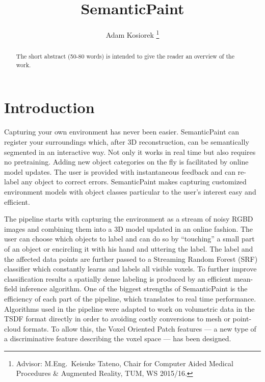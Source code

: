 \documentclass{llncs}
\begin{document}
	\title{SemanticPaint}
	\author{Adam Kosiorek
	\thanks{Advisor: M.Eng.~Keisuke Tateno, Chair for Computer Aided Medical Procedures \& Augmented Reality, TUM, WS 2015/16.}}
	\institute{}
	\maketitle

\begin{abstract}
	The short abstract (50-80 words) is intended to give the reader an overview of the work.
\end{abstract}

\section{Introduction}
  
  Capturing your own environment has never been easier. SemanticPaint can register your surroundings which, after 3D reconstruction, can be semantically segmented in an interactive way. Not only it works in real time but also requires no pretraining. Adding new object categories on the fly is facilitated by online model updates. The user is provided with instantaneous feedback and can re-label any object to correct errors. SemanticPaint makes capturing customized environment models with object classes particular to the user's interest easy and efficient.  
  
  The pipeline starts with capturing the environment as a stream of noisy RGBD images and combining them into a  3D model updated in an online fashion. The user can choose which objects to label and can do so by ``touching'' a small part of an object or encircling it with his hand and uttering the label. The label and the affected data points are further passed to a Streaming Random Forest (SRF) classifier which constantly learns and labels all visible voxels. To further improve classification results a spatially dense labeling is produced by an efficient mean-field inference algorithm. One of the biggest strengths of SemanticPaint is the efficiency of each part of the pipeline, which translates to real time performance. Algorithms used in the pipeline were adapted to work on volumetric data in the TSDF format directly in order to avoiding costly conversions to mesh or point-cloud formats. To allow this, the Voxel Oriented Patch features --- a new type of a discriminative feature describing the voxel space --- has been designed. 
 
\end{document}
